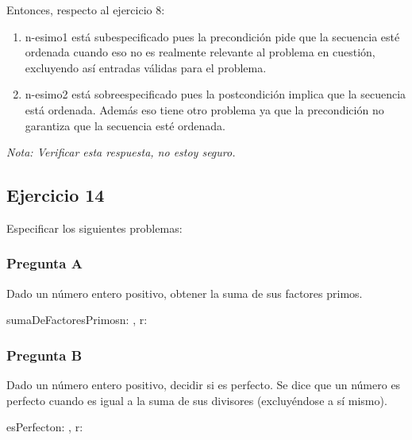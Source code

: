 Entonces, respecto al ejercicio 8:

\begin{enumerate}[1)]
    \item n-esimo1 está subespecificado pues la precondición pide que la secuencia esté ordenada cuando eso no es realmente relevante al problema en cuestión, excluyendo así entradas válidas para el problema.
    \item n-esimo2 está sobreespecificado pues la postcondición implica que la secuencia está ordenada. Además eso tiene otro problema ya que la precondición no garantiza que la secuencia esté ordenada.
\end{enumerate}

{\em Nota: Verificar esta respuesta, no estoy seguro.}

\subsection{Ejercicio 14}

Especificar los siguientes problemas:

\subsubsection{Pregunta A}

Dado un número entero positivo, obtener la suma de sus factores primos.


\begin{proc}{sumaDeFactoresPrimos}{\In n: \ent, \Out r: \ent}{}
\end{proc}

\subsubsection{Pregunta B}

Dado un número entero positivo, decidir si es perfecto. Se dice que un número es perfecto cuando es igual a la suma de sus divisores (excluyéndose a sí mismo).

\begin{proc}{esPerfecto}{\In n: \ent, \Out r: \bool}{}
\end{proc}

